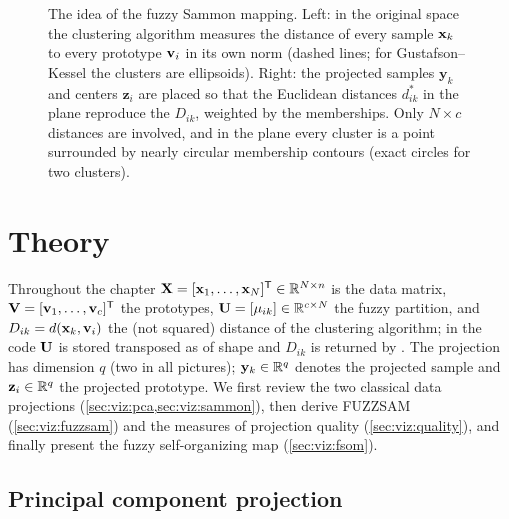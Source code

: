\begin{figure}[htbp]
\caption[The idea of the fuzzy Sammon mapping.]{The idea of the fuzzy Sammon mapping. Left: in the original space the clustering algorithm measures the distance of every sample $\mathbf{x}_k$ to every prototype $\mathbf{v}_i$ in its own norm (dashed lines; for Gustafson--Kessel the clusters are ellipsoids). Right: the projected samples $\mathbf{y}_k$ and centers $\mathbf{z}_i$ are placed so that the Euclidean distances $d^*_{ik}$ in the plane reproduce the $D_{ik}$, weighted by the memberships. Only $N\times c$ distances are involved, and in the plane every cluster is a point surrounded by nearly circular membership contours (exact circles for two clusters).}
\label{fig:viz:concept}
\end{figure}

\section{Theory}\label{sec:viz:theory}

Throughout the chapter $\mathbf{X}=[\mathbf{x}_1,\dots,\mathbf{x}_N]^{\mathsf{T}}\in\mathbb{R}^{N\times n}$ is the data matrix, $\mathbf{V}=[\mathbf{v}_1,\dots,\mathbf{v}_c]^{\mathsf{T}}$ the prototypes, $\mathbf{U}=[\mu_{ik}]\in\mathbb{R}^{c\times N}$ the fuzzy partition, and $D_{ik}=d(\mathbf{x}_k,\mathbf{v}_i)$ the (not squared) distance of the clustering algorithm; in the code $\mathbf{U}$ is stored transposed as  of shape  and $D_{ik}$ is returned by . The projection has dimension $q$ (two in all pictures); $\mathbf{y}_k\in\mathbb{R}^q$ denotes the projected sample and $\mathbf{z}_i\in\mathbb{R}^q$ the projected prototype. We first review the two classical data projections (\cref{sec:viz:pca,sec:viz:sammon}), then derive FUZZSAM (\cref{sec:viz:fuzzsam}) and the measures of projection quality (\cref{sec:viz:quality}), and finally present the fuzzy self-organizing map (\cref{sec:viz:fsom}).

\subsection{Principal component projection}\label{sec:viz:pca}

